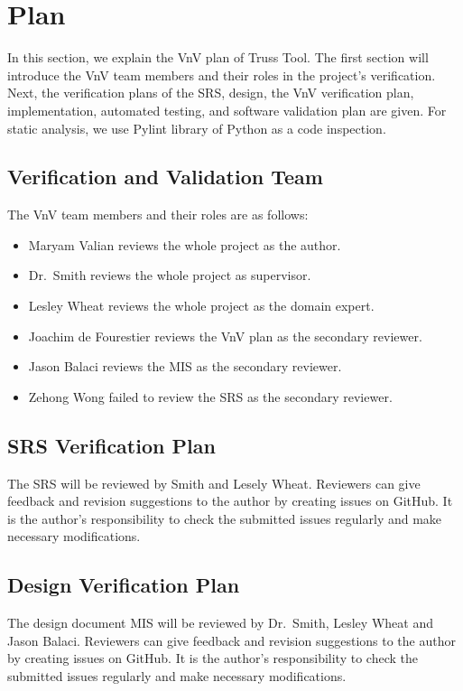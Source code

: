 \documentclass[12pt, titlepage]{article}
\begin{document}
\section{Plan}
In this section, we explain the VnV plan of Truss Tool. The first section will introduce the VnV team members and their roles in the project's verification. Next, the verification plans of the SRS, design, the VnV verification plan, implementation, automated testing, and software validation plan are given. For static analysis, we use Pylint library of Python as a code inspection. 

\subsection{Verification and Validation Team} \label{VTeam}
The VnV team members and their roles are as follows:
\begin{itemize}
\item {Maryam Valian reviews the whole project as the author.}
\item {Dr.\  Smith reviews the whole project as supervisor.}
\item{Lesley Wheat reviews the whole project as the domain expert.}
\item{Joachim de Fourestier reviews the VnV plan as the secondary reviewer.}
\item{Jason Balaci reviews the MIS as the secondary reviewer.}
\item{Zehong Wong failed to review the SRS as the secondary reviewer.}

\end{itemize}

\subsection{SRS Verification Plan} \label{SRSvplan}
The SRS will be reviewed by  Smith and Lesely Wheat. Reviewers can give feedback and revision suggestions to the author by creating issues on GitHub. It is the author's responsibility to check the submitted issues regularly and make necessary modifications.

\subsection{Design Verification Plan} \label{Sec_Design_verific}

The design document MIS will be reviewed by Dr.\  Smith, Lesley Wheat and Jason Balaci. Reviewers can give feedback and revision suggestions to the author by creating issues on GitHub. It is the author's responsibility to check the submitted issues regularly and make necessary modifications.
\end{document}
